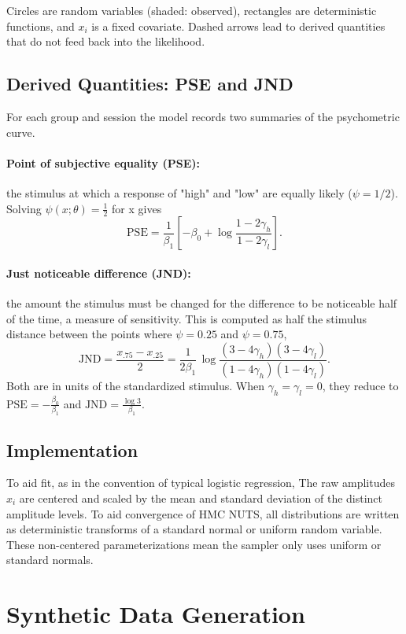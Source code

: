 \documentclass[11pt]{article}
\begin{document}
\noindent
Circles are random variables (shaded: observed), rectangles are deterministic
functions, and $x_i$ is a fixed covariate. Dashed arrows lead to derived
quantities that do not feed back into the likelihood.


\subsection{Derived Quantities: PSE and JND}

For each group and session the model records two summaries of the psychometric
curve.

\paragraph{Point of subjective equality (PSE):} the stimulus at which a response of "high" and "low" are equally likely ($\psi = 1/2$). Solving
$\psi(x;\theta) = \tfrac12$ for x gives
\[
  \text{PSE} = \frac{1}{\beta_1}\left[-\beta_0 + \log\frac{1-2\gamma_h}{1-2\gamma_l}\right].
\]

\paragraph{Just noticeable difference (JND):} the amount the stimulus must be changed for the
difference to be noticeable half of the time, a measure of sensitivity. This is computed as half the stimulus distance between the points where $\psi = 0.25$ and $\psi = 0.75$,
\[
  \text{JND} = \frac{x_{.75} - x_{.25}}{2}
  = \frac{1}{2\beta_1}\,\log\frac{(3-4\gamma_h)(3-4\gamma_l)}{(1-4\gamma_h)(1-4\gamma_l)} .
\]
Both are in units of the standardized stimulus. When
$\gamma_h=\gamma_l=0$, they reduce to $\text{PSE} = - \frac{\beta_0}{\beta_1} $ and $\text{JND} =  \frac{\log 3}{\beta_1}$.

\subsection{Implementation}

To aid fit, as in the convention of typical logistic regression, The raw amplitudes $x_i$ are centered and scaled by the mean and standard deviation of the distinct amplitude levels. To aid convergence of HMC NUTS, all distributions are written as deterministic transforms of a standard normal or uniform random variable. These non-centered parameterizations mean the sampler only uses uniform or standard normals.

\section{Synthetic Data Generation}
\end{document}
